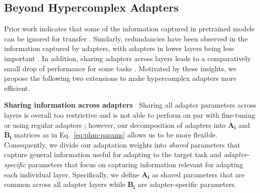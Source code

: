 \documentclass{article}
\begin{document}
\subsection{Beyond Hypercomplex Adapters}

Prior work indicates that some of the information captured in pretrained models can be ignored for transfer \citep{Zhang2021revisiting,Chung2021rembert}. Similarly, redundancies have been observed in the information captured by adapters, with adapters in lower layers being less important \citep{houlsby2019parameter}. In addition, sharing adapters across layers leads to a comparatively small drop of performance for some tasks \citep{Ruckle2020adapterdrop}. 
Motivated by these insights, we propose the following two extensions to make hypercomplex adapters more efficient. 

\noindent \textbf{Sharing information across adapters} $\:$ Sharing all adapter parameters across layers is overall too restrictive and is not able to perform on par with fine-tuning or using regular adapters \citep{Ruckle2020adapterdrop}; however, our decomposition of adapters into $\bm{A_i}$ and $\bm{B_i}$ matrices as in Eq.~\eqref{eq:phm-params} allows us to be more flexible. Consequently, we divide our adaptation weights into \emph{shared} parameters that capture general information useful for adapting to the target task and \emph{adapter-specific} parameters that focus on capturing information relevant for adapting each individual layer. Specifically, we define $\bm{A_i}$ as shared parameters that are common across all adapter layers while $\bm{B_i}$ are adapter-specific parameters.
\end{document}
